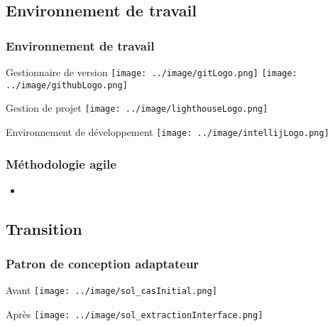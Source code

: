 \subsection{Environnement de travail}
\begin{frame}\frametitle{Environnement de travail}
\begin{minipage}[c]{.46\linewidth}
	\begin{beamerboxesrounded}[shadow=true,center]{Gestionnaire de version}
		\centering
		\texttt{[image: ../image/gitLogo.png]}
		\texttt{[image: ../image/githubLogo.png]}
	\end{beamerboxesrounded}
\end{minipage}
\hfill
\begin{minipage}[c]{.46\linewidth}
\begin{beamerboxesrounded}[shadow=true]{Gestion de projet}
	\centering
	\texttt{[image: ../image/lighthouseLogo.png]}
\end{beamerboxesrounded}
\end{minipage}
\vfill
\hfil
\begin{minipage}[c]{.6\linewidth}
\begin{beamerboxesrounded}[shadow=true]{Environnement de développement}
	\centering
	\texttt{[image: ../image/intellijLogo.png]}
\end{beamerboxesrounded}
\end{minipage}
\end{frame}
\begin{frame}\frametitle{Méthodologie agile}
\begin{itemize}
 \item 
\end{itemize}

\end{frame}
\subsection{Transition}
\begin{frame}\frametitle{Patron de conception adaptateur}
\begin{minipage}[c]{.46\linewidth}
\begin{beamerboxesrounded}[shadow=true]{Avant}
	\texttt{[image: ../image/sol\_casInitial.png]}
\end{beamerboxesrounded}
\end{minipage}
\hfill
\begin{minipage}[c]{.46\linewidth}
\begin{beamerboxesrounded}[shadow=true]{Après}
	\texttt{[image: ../image/sol\_extractionInterface.png]}
\end{beamerboxesrounded}
\end{minipage}
\end{frame}
